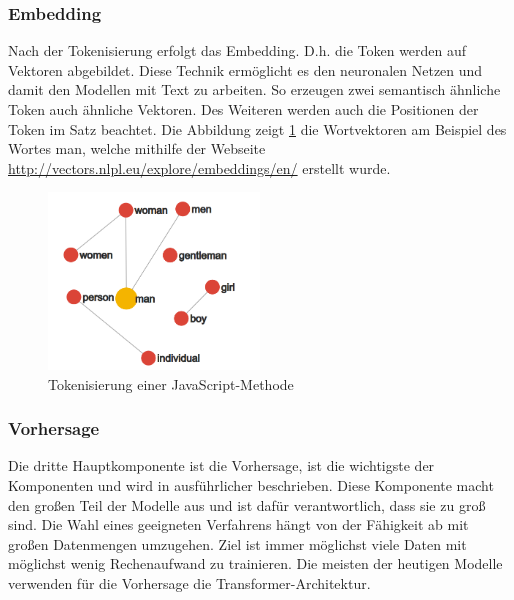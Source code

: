 \subsubsection{Embedding}
Nach der Tokenisierung erfolgt das Embedding. D.h. die Token werden auf Vektoren abgebildet. Diese Technik ermöglicht es den neuronalen Netzen und damit den Modellen mit Text zu arbeiten. So erzeugen zwei semantisch ähnliche Token auch ähnliche Vektoren. Des Weiteren werden auch die Positionen der Token im Satz beachtet. Die Abbildung zeigt \ref{img:tokenize_transformation} die Wortvektoren am Beispiel des Wortes \glqq man\grqq, welche mithilfe der Webseite \href{http://vectors.nlpl.eu/explore/embeddings/en/}{http://vectors.nlpl.eu/explore/embeddings/en/} erstellt wurde.

\begin{center}
	\begin{figure}[!ht]
		\includegraphics[width=0.5\textwidth]{content/chapter_basics/images/tokenize_transformation.png}
		\centering
		\caption{Tokenisierung einer JavaScript-Methode}
		\label{img:tokenize_transformation}
	\end{figure}
\end{center}


\subsubsection{Vorhersage}
Die dritte Hauptkomponente ist die Vorhersage, ist die wichtigste der Komponenten und wird in \cite{vaswani-2017} ausführlicher beschrieben. Diese Komponente macht den großen Teil der Modelle aus und ist dafür verantwortlich, dass sie zu groß sind. Die Wahl eines geeigneten Verfahrens hängt von der Fähigkeit ab mit großen Datenmengen umzugehen. Ziel ist immer möglichst viele Daten mit möglichst wenig Rechenaufwand zu trainieren. Die meisten der heutigen Modelle verwenden für die Vorhersage die Transformer-Architektur.\vspace{0.2cm}

